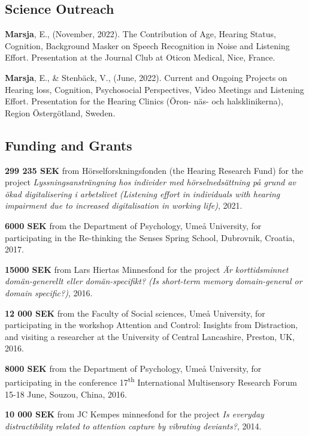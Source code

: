 \documentclass[]{article}
\begin{document}
\hypertarget{science-outreach}{%
\subsection{Science Outreach}\label{science-outreach}}

\textbf{Marsja}, E., (November, 2022). The Contribution of Age, Hearing
Status, Cognition, Background Masker on Speech Recognition in Noise and
Listening Effort. Presentation at the Journal Club at Oticon Medical,
Nice, France.

\textbf{Marsja}, E., \& Stenbäck, V., (June, 2022). Current and Ongoing
Projects on Hearing loss, Cognition, Psychosocial Perspectives, Video
Meetings and Listening Effort. Presentation for the Hearing Clinics
(Öron- näs- och halsklinikerna), Region Östergötland, Sweden.

\hypertarget{funding-and-grants}{%
\subsection{Funding and Grants}\label{funding-and-grants}}

\textbf{299 235 SEK} from Hörselforskningsfonden (the Hearing Research
Fund) for the project \emph{Lyssningsansträngning hos individer med
hörselnedsättning på grund av ökad digitalisering i arbetslivet
(Listening effort in individuals with hearing impairment due to
increased digitalisation in working life)}, 2021.

\textbf{6000 SEK} from the Department of Psychology, Umeå University,
for participating in the Re-thinking the Senses Spring School,
Dubrovnik, Croatia, 2017.

\textbf{15000 SEK} from Lars Hiertas Minnesfond for the project \emph{Är
korttidsminnet domän-generellt eller domän-specifikt? (Is short-term
memory domain-general or domain specific?)}, 2016.

\textbf{12 000 SEK} from the Faculty of Social sciences, Umeå
University, for participating in the workshop Attention and Control:
Insights from Distraction, and visiting a researcher at the University
of Central Lancashire, Preston, UK, 2016.

\textbf{8000 SEK} from the Department of Psychology, Umeå University,
for participating in the conference 17\textsuperscript{th} International
Multisensory Research Forum 15-18 June, Souzou, China, 2016.

\textbf{10 000 SEK} from JC Kempes minnesfond for the project \emph{Is
everyday distractibility related to attention capture by vibrating
deviants?}, 2014.
\end{document}
